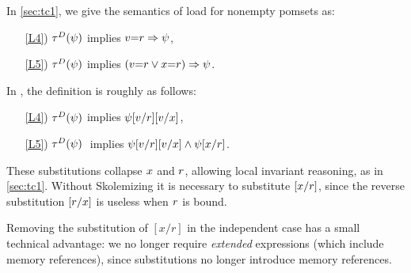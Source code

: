 In \textsection\ref{sec:tc1}, %
we give the semantics of load for nonempty pomsets as:
\begin{enumerate}
\item[\ref{L4})]
  $\aTr{\bEvs}{\bForm}$ implies $v{=}r\Rightarrow\psi$, 
\item[\ref{L5})]
  $\aTr{\cEvs}{\bForm}$ implies
  $(v{=}r\lor x{=}r)\Rightarrow\psi$.
\end{enumerate}
In \jjr{}, the definition is roughly as follows:
\begin{enumerate}
\item[\ref{L4})]
  $\aTr{\bEvs}{\bForm}$ implies $\psi[v/r][v/x]$, 
\item[\ref{L5})]
  $\aTr{\cEvs}{\bForm}\;$ implies $\psi[v/r][v/x]\land\psi[x/r]$.
\end{enumerate}
These substitutions collapse $x$ and $r$, allowing local invariant
reasoning, as in \textsection\ref{sec:tc1}.  Without Skolemizing it is
necessary to substitute $[x/r]$, since the reverse substitution
$[r/x]$ is useless when $r$ is bound.

Removing the substitution of $[x/r]$ in the independent case has a small
technical advantage: we no longer require \emph{extended} expressions (which
include memory references), since substitutions no longer introduce memory
references.

